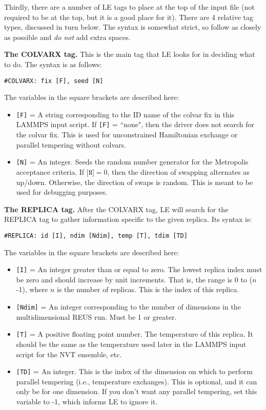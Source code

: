 \documentclass[10pt]{article}
\begin{document}
Thirdly, there are a number of LE tags to place
at the top of the input file (not required to be at the top, but it is a good place for it). 
There are 4 relative tag types, discussed in turn below. The syntax is somewhat strict,
so follow as closely as possible and {\em do not} add extra spaces.

\textbf{The COLVARX tag.}
This is the main tag that LE looks for in deciding what to do.
The syntax is as follows:
\begin{verbatim}
#COLVARX: fix [F], seed [N]
\end{verbatim}
The variables in the square brackets are described here:
\begin{itemize}
\item	\texttt{[F]} = A string corresponding to the ID name of the colvar fix
		in this LAMMPS input script. If \texttt{[F]} = ``none", then the driver does
		not search for the colvar fix. This is used for unconstrained Hamiltonian exchange
		or parallel tempering without colvars.
\item	\texttt{[N]} = An integer. Seeds the random number generator for the Metropolis
		acceptance criteria.
		If $\texttt{[N]} = 0$,
		then the direction of swapping alternates as up/down. Otherwise, the direction of swaps
		is random. This is meant to be used for debugging purposes.
\end{itemize}

\textbf{The REPLICA tag.}
After the COLVARX tag, LE will search for the REPLICA tag to gather information specific
to the given replica. Its syntax is:
\begin{verbatim}
#REPLICA: id [I], ndim [Ndim], temp [T], tdim [TD]
\end{verbatim}
The variables in the square brackets are described here:
\begin{itemize}
\item	\texttt{[I]} = An integer greater than or equal to zero. The lowest
		replica index must be zero and should increase by unit increments. That is,
		the range is 0 to ($n$-1), where $n$ is the number of replicas. This is
		the index of this replica.
\item	\texttt{[Ndim]} = An integer corresponding to the number of dimensions
		in the multidimensional REUS run. Must be 1 or greater.
\item	\texttt{[T]} = A positive floating point number. The temperature of this replica.
		It should be the same as the temperature used later in the LAMMPS input script
		for the NVT ensemble, etc.
\item	\texttt{[TD]} = An integer. This is the index of the dimension on which to perform
		parallel tempering (i.e., temperature exchanges). This is optional, and it can only be
		for one dimension. If you don't want any parallel tempering, set this variable to -1,
		which informs LE to ignore it.
\end{itemize}
\end{document}
